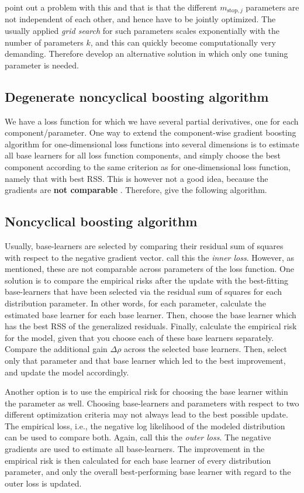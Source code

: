 \citet{thomas2018} point out a problem with this and that is that the different $m_{\text{stop},j}$ parameters are not independent of each other, and hence have to be jointly optimized. The usually applied \textit{grid search} for such parameters scales exponentially with the number of parameters $k$, and this can quickly become computationally very demanding. Therefore \citet{thomas2018} develop an alternative solution in which only one tuning parameter is needed.

\subsection{Degenerate noncyclical boosting algorithm}
We have a loss function for which we have several partial derivatives, one for each component/parameter. One way to extend the component-wise gradient boosting algorithm for one-dimensional loss functions into several dimensions is to estimate all base learners for all loss function components, and simply choose the best component according to the same criterion as for one-dimensional loss function, namely that with best RSS. This is however not a good idea, because the gradients are \textbf{not comparable} \citep{thomas2018}. Therefore, \citet{thomas2018} give the following algorithm.

\subsection{Noncyclical boosting algorithm}
Usually, base-learners are selected by comparing their residual sum of squares with respect to the negative gradient vector. \citet{thomas2018} call this the \textit{inner loss}. However, as mentioned, these are not comparable across parameters of the loss function. One solution is to compare the empirical risks after the update with the best-fitting base-learners that have been selected via the residual sum of squares for each distribution parameter. In other words, for each parameter, calculate the estimated base learner for each base learner. Then, choose the base learner which has the best RSS of the generalized residuals. Finally, calculate the empirical risk for the model, given that you choose each of these base learners separately. Compare the additional gain $\Delta\rho$ across the selected base learners. Then, select only that parameter and that base learner which led to the best improvement, and update the model accordingly.

Another option is to use the empirical risk for choosing the base learner within the parameter as well. Choosing base-learners and parameters with respect to two different optimization criteria may not always lead to the best possible update. The empirical loss, i.e., the negative log likelihood of the modeled distribution can be used to compare both. Again, \citet{thomas2018} call this the \textit{outer loss}. The negative gradients are used to estimate all base-learners. The improvement in the empirical risk is then calculated for each base learner of every distribution parameter, and only the overall best-performing base learner with regard to the outer loss is updated.


